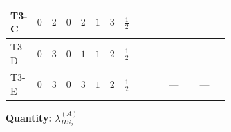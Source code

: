 \documentclass[8pt]{article}
\begin{document}
\begin{landscape}
\begin{longtable}{@{}llcccccc >{\raggedright\arraybackslash}p{0.21\linewidth} >{\raggedright\arraybackslash}p{0.21\linewidth} >{\raggedright\arraybackslash}p{0.21\linewidth}@{}}
\midrule
T3-C & $0$ & $2$ & $0$ & $2$ & $1$ & $3$ & $\frac{1}{2}$ & \scriptsize\adjustbox{max width=\linewidth}{$\begin{gathered} +2 {\lambda_{HS_2}^{(A)}} {\lambda_{S_2}^{(1)}}\end{gathered}$} & \scriptsize\adjustbox{max width=\linewidth}{$\begin{gathered} {\lambda_{HS_2}^{(A)}} (6 \operatorname{Tr}\!\left({Y_d}\,\left({Y_d}\right)^{\dagger}\right)+2 \operatorname{Tr}\!\left({Y_e}\,\left({Y_e}\right)^{\dagger}\right)+6 \operatorname{Tr}\!\left({Y_u}\,\left({Y_u}\right)^{\dagger}\right))\end{gathered}$} & \scriptsize\adjustbox{max width=\linewidth}{$\begin{gathered} +16 {\lambda_5} \left({\lambda_5}\right)^{*}\end{gathered}$} \\
\midrule
T3-D & $0$ & $3$ & $0$ & $1$ & $1$ & $2$ & $\frac{1}{2}$ & --- & --- & --- \\
\midrule
T3-E & $0$ & $3$ & $0$ & $3$ & $1$ & $2$ & $\frac{1}{2}$ & \scriptsize\adjustbox{max width=\linewidth}{$\begin{gathered} +2 {\lambda_{HS_2}^{(A)}} {\lambda_{S_2}^{(1)}}\end{gathered}$} & --- & --- \\
\midrule
\bottomrule
\end{longtable}
\clearpage
\noindent\textbf{Quantity: }$\lambda_{HS_2}^{(A)}$\par\smallskip

\end{landscape}
\end{document}
